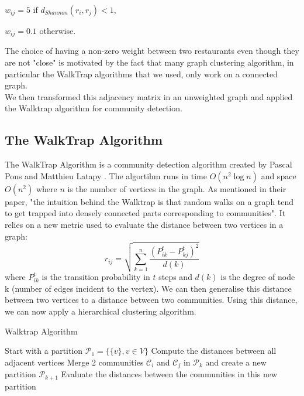 \documentclass[twoside]{article}
\begin{document}
\begin{multicols}{2}
\begin{compactitem}
\item $w_{ij} = 5$ if $d_{Shannon}(r_i,r_j)<1$,
\item $w_{ij} = 0.1$ otherwise.\\
\end{compactitem}

\noindent The choice of having a non-zero weight between two restaurants even though they are not "close" is motivated by the fact that many graph clustering algorithm, in particular the WalkTrap algorithms that we used, only work on a connected graph.\\

\noindent We then transformed this adjacency matrix in an unweighted graph and applied the Walktrap algorithm for community detection.\\

\subsection{The WalkTrap Algorithm}
The WalkTrap Algorithm is a community detection algorithm created by Pascal Pons and Matthieu Latapy \cite{Gr}. The algortihm runs in time $O(n^2\log n)$ and space $O(n^2)$ where $n$ is the number of vertices in the graph. As mentioned in their paper, "the intuition behind the Walktrap is that random walks on a graph tend to get trapped into densely connected parts corresponding to communities".\cite{Gr} It relies on a new metric used to evaluate the distance between two vertices in a graph:
 $$r_{ij} = \sqrt{\sum\limits_{k=1}^{n}\frac{(P^t_{ik}-P^t_{kj})^2}{d(k)}}$$
 where $P^t_{ik}$ is the transition probability in $t$ steps and $d(k)$ is the degree of node k (number of edges incident to the vertex). We can then generalise this distance between two vertices to a distance between two communities. Using this distance, we can now apply a hierarchical clustering algorithm.

\begin{algorithm}[H]
\caption{Walktrap Algorithm}\label{euclid}
\begin{algorithmic}[1]
\State Start with a partition $\mathcal{P}_1=\{\{v\}, v \in V\}$
\State Compute the distances between all adjacent vertices
\State Merge 2 communities $\mathcal{C}_i$ and $\mathcal{C}_j$ in $\mathcal{P}_k$ and create a new partition $\mathcal{P}_{k+1}$
\State Evaluate the distances between the communities in this new partition
\EndWhile
\end{algorithmic}
\end{algorithm}


\end{multicols}
\end{document}
